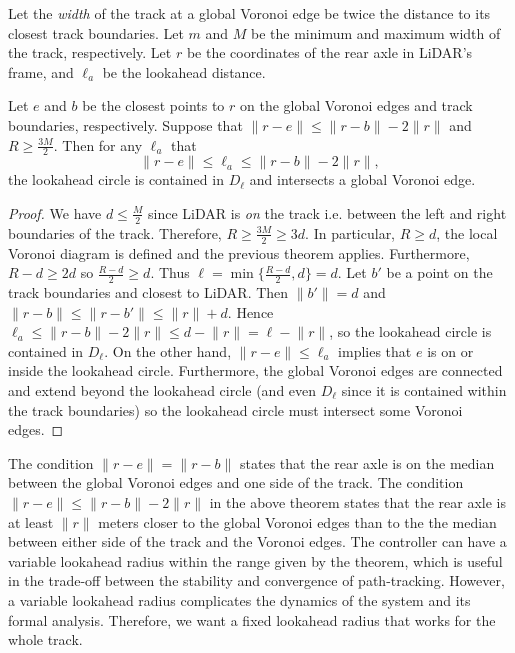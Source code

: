 Let the \emph{width} of the track at a global Voronoi edge be twice the distance to its closest track boundaries.
%
Let $m$ and $M$ be the minimum and maximum width of the track, respectively.
%
Let $r$ be the coordinates of the rear axle in LiDAR's frame, and $\ell_a$ be the lookahead distance.

\begin{theorem}
Let $e$ and $b$ be the closest points to $r$ on the global Voronoi edges and track boundaries, respectively.
%
Suppose that 
$\lVert r-e \rVert \leq \lVert r-b \rVert - 2 \lVert r \rVert$ and 
$R \geq \frac{3M}{2}$.
%
Then for any $\ell_a$ that 
$$
\lVert r-e \rVert 
\leq \ell_a
\leq \lVert r-b \rVert - 2 \lVert r \rVert,
$$
the lookahead circle is contained in $D_\ell$ and intersects a global Voronoi edge.
\end{theorem}

\begin{proof}
We have $d \leq \frac{M}{2}$ since LiDAR is \emph{on} the track i.e. between the left and right boundaries of the track.
%
Therefore, $R \geq \frac{3M}{2} \geq 3d$.
%
In particular, $R \geq d$, the local Voronoi diagram is defined and the previous theorem applies.
%
Furthermore,
$R-d \geq 2d$ so $\frac{R-d}{2} \geq d$.
%
Thus $\ell = \min \{ \frac{R-d}{2}, d \} = d$.
%
Let $b'$ be a point on the track boundaries and closest to LiDAR.
%
Then $ \lVert b' \rVert = d$ and
$\lVert r-b \rVert 
\leq \lVert r-b' \rVert 
\leq \lVert r \rVert + d $.
%
Hence
$\ell_a 
\leq \lVert r-b \rVert - 2 \lVert r \rVert
\leq d - \lVert r \rVert
= \ell - \lVert r \rVert$,
so the lookahead circle is contained in $D_\ell$.
%
On the other hand, $\lVert r-e \rVert \leq \ell_a$ implies that $e$ is on or inside the lookahead circle.
%
Furthermore, the global Voronoi edges are connected and extend beyond the lookahead circle (and even $D_\ell$ since it is contained within the track boundaries) so the lookahead circle must intersect some Voronoi edges.
\end{proof}

The condition $\lVert r-e \rVert = \lVert r-b \rVert $ states that the rear axle is on the median between the global Voronoi edges and one side of the track.
%
The condition $\lVert r-e \rVert \leq \lVert r-b \rVert - 2 \lVert r \rVert$ in the above theorem states that the rear axle is at least $\lVert r \rVert$ meters closer to the global Voronoi edges than to the the median between either side of the track and the Voronoi edges.
%
The controller can have a variable lookahead radius within the range given by the theorem, which is useful in the trade-off between the stability and convergence of path-tracking.
%
However, a variable lookahead radius complicates the dynamics of the system and its formal analysis.
%
Therefore, we want a fixed lookahead radius that works for the whole track.


